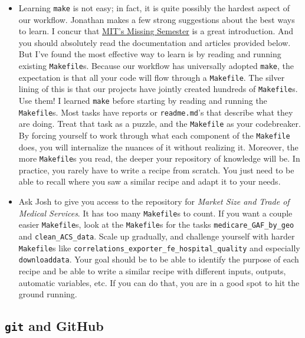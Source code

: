 \begin{itemize}
\item Learning \texttt{make} is not easy; in fact, 
it is quite possibly the hardest aspect of our workflow. 
Jonathan makes a few strong suggestions about the best ways to learn. 
I concur that \href{https://www.youtube.com/watch?v=_Ms1Z4xfqv4}{MIT's Missing Semester} is a great introduction.
And you should absolutely read the documentation and articles provided below.
But I've found the most effective way to learn 
is by reading and running existing \texttt{Makefile}s.
Because our workflow has universally adopted \texttt{make}, 
the expectation is that all your code will flow through a \texttt{Makefile}.
The silver lining of this is that our projects have jointly created hundreds of \texttt{Makefile}s. 
Use them! 
I learned \texttt{make} before starting by reading and running the \texttt{Makefile}s. 
Most tasks have reports or \texttt{readme.md}'s that describe what they are doing. 
Treat that task as a puzzle, and the \texttt{Makefile} as your codebreaker. 
By forcing yourself to work through what each component of the \texttt{Makefile} does, 
you will internalize the nuances of it without realizing it. 
Moreover, the more \texttt{Makefile}s you read, 
the deeper your repository of knowledge will be. 
In practice, you rarely have to write a recipe from scratch.
You just need to be able to recall where you saw a similar recipe 
and adapt it to your needs.

\item Ask Josh to give you access to the repository for 
\textit{Market Size and Trade of Medical Services}.
It has too many \texttt{Makefile}s to count. 
If you want a couple easier \texttt{Makefile}s, 
look at the \texttt{Makefile}s for the tasks 
\texttt{medicare\_GAF\_by\_geo} and \texttt{clean\_ACS\_data}.
Scale up gradually, and challenge yourself with harder \texttt{Makefile}s 
like \texttt{correlations\_exporter\_fe\_hospital\_quality} 
and especially \texttt{downloaddata}.
Your goal should be to be able to identify the purpose of each recipe 
and be able to write a similar recipe with different inputs, outputs, 
automatic variables, etc.
If you can do that, you are in a good spot to hit the ground running.

\end{itemize}

\subsection{\texttt{git} and GitHub}

